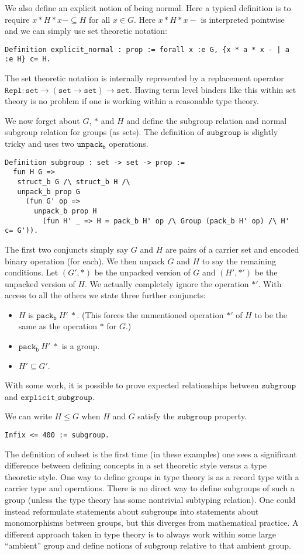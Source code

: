\documentclass{article}
\begin{document}
We also define an explicit notion of being normal. Here a typical definition is to require $x * H * x-\subseteq H$
for all $x\in G$. Here $x * H * x-$ is interpreted pointwise and we can simply use set theoretic notation:
\begin{verbatim}
Definition explicit_normal : prop := forall x :e G, {x * a * x - | a :e H} c= H.
\end{verbatim}
The set theoretic notation is internally represented by a replacement operator $\mathtt{Repl}:\mathtt{set}\to(\mathtt{set}\to\mathtt{set})\to\mathtt{set}$.
Having term level binders like this within set theory is no problem if one is working within a reasonable type theory.

We now forget about $G$, $*$ and $H$ and define the subgroup relation and normal subgroup relation
for groups (as sets). The definition of $\mathtt{subgroup}$ is slightly tricky and uses two $\mathtt{unpack_b}$ operations.
\begin{verbatim}
Definition subgroup : set -> set -> prop :=
  fun H G =>
   struct_b G /\ struct_b H /\
   unpack_b prop G
     (fun G' op =>
       unpack_b prop H
         (fun H' _ => H = pack_b H' op /\ Group (pack_b H' op) /\ H' c= G')).
\end{verbatim}
The first two conjuncts simply say $G$ and $H$ are pairs of a carrier set and encoded binary operation (for each).
We then unpack $G$ and $H$ to say the remaining conditions.
Let $(G',*)$ be the unpacked version of $G$ and $(H',*')$ be the unpacked version of $H$.
We actually completely ignore the operation $*'$. With access to all the others we state three further conjuncts:
\begin{itemize}
\item $H$ is $\mathtt{pack_b}~H'~*$. (This forces the unmentioned operation $*'$ of $H$ to be the same as the operation $*$ for $G$.)
\item $\mathtt{pack_b}~H'~*$ is a group.
\item $H'\subseteq G'$.
\end{itemize}
With some work, it is possible to prove expected relationships between $\mathtt{subgroup}$ and $\mathtt{explicit\_subgroup}$.

We can write $H\leq G$ when $H$ and $G$ satisfy the $\mathtt{subgroup}$ property.
\begin{verbatim}
Infix <= 400 := subgroup.
\end{verbatim}

The definition of subset is the first time (in these examples) one sees a significant difference
between defining concepts in a set theoretic style versus a type theoretic style.
One way to define groups in type theory is as a record type with a carrier type and operations.
There is no direct way to define subgroups of such a group (unless the type theory has some nontrivial subtyping relation).
One could instead reformulate statements about subgroups into statements about monomorphisms
between groups, but this diverges from mathematical practice.
A different approach taken in type theory is to always work within some large ``ambient'' group and
define notions of subgroup relative to that ambient group.
\end{document}
